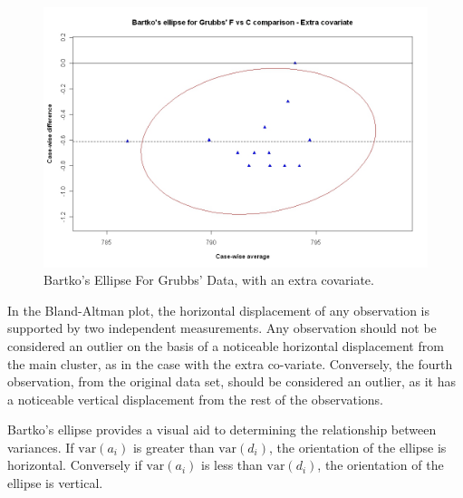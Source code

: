 \documentclass[compress]{beamer}        %
\begin{document}
\begin{frame}
\begin{figure}[h!]
  \includegraphics[width=130mm]{GrubbsBartko2.jpeg}
  \caption{Bartko's Ellipse For Grubbs' Data, with an extra covariate.}\label{GrubbsBartko2}
\end{figure}
\end{frame}

\begin{frame}
In the Bland-Altman plot, the horizontal displacement of any
observation is supported by two independent measurements. Any
observation should not be considered an outlier on the basis of a
noticeable horizontal displacement from the main cluster, as in
the case with the extra co-variate. Conversely, the fourth
observation, from the original data set, should be considered an
outlier, as it has a noticeable vertical displacement from the
rest of the observations.
\end{frame}

\begin{frame}
Bartko's ellipse provides a visual aid to determining the
relationship between variances. If $\mbox{var}(a_{i})$ is greater
than $\mbox{var}(d_{i})$, the orientation of the ellipse is
horizontal. Conversely if $\mbox{var}(a_{i})$ is less than
$\mbox{var}(d_{i})$, the orientation of the ellipse is vertical.
\end{frame}


\end{document}
